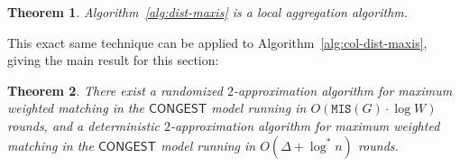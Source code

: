 \documentclass[11pt]{article}
\newtheorem{theorem}{Theorem}[section]
\newcommand{\Wmax}{W}%
\newcommand{\MIS}{\texttt{MIS}(G)}
\begin{document}
\begin{theorem}
	\label{thm:dist-maxis-is-agg-alg}
	Algorithm~\ref{alg:dist-maxis} is a local aggregation algorithm.
\end{theorem}

This exact same technique can be applied to Algorithm~\ref{alg:col-dist-maxis}, giving the main result for this section:
\begin{theorem}
	There exist a randomized $2$-approximation algorithm for maximum weighted matching in the $\mathsf{CONGEST}$ model running in $O(\MIS\cdot\log \Wmax)$ rounds, and a deterministic $2$-approximation algorithm for maximum weighted matching in the $\mathsf{CONGEST}$ model running in $O(\Delta + \log^* n)$ rounds.
\end{theorem}


%
%
\end{document}
